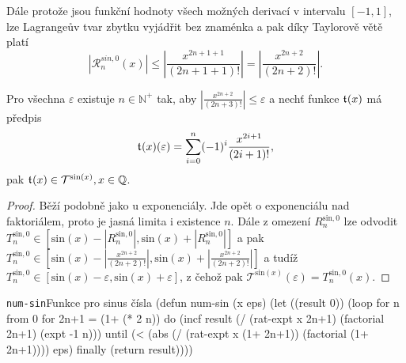 Dále protože jsou funkční hodnoty všech možných derivací v intervalu $[-1,1]$, lze Lagrangeův tvar zbytku vyjádřit bez znaménka a pak díky Taylorově větě platí
\begin{equation}
\left|\mathcal{R}^{sin, 0}_n(x)\right|\leq\left|\frac{x^{2n+1+1}}{(2n+1+1)!}\right|=\left|\frac{x^{2n+2}}{(2n+2)!}\right|.
\end{equation}

\begin{consequence}
Pro všechna $\varepsilon$ existuje $n\in\mathbb{N}^+$ tak, aby $\left|\frac{x^{2n+2}}{(2n+3)!}\right| \leq \varepsilon$ a nechť funkce $\mathfrak{t}^{}(x)$ má předpis
\begin{equation}
\mathfrak{t}^{}(x)(\varepsilon)=\sum_{i=0}^n (-1)^i \frac{x^{2i+1}}{(2i+1)!},
\end{equation}
pak $\mathfrak{t}^{}(x)\in\mathcal{T}^{\mathrm{sin}(x)},x\in\mathbb{Q}$.
\begin{proof}
Běží podobně jako u exponenciály. Jde opět o exponenciálu nad faktoriálem, proto je jasná limita i existence $n$. Dále z omezení $R^{\mathrm{sin}, 0}_n$ lze odvodit $T^{\mathrm{sin}, 0}_n\in[\mathrm{sin}(x)-|R^{\mathrm{sin}, 0}_n|,\mathrm{sin}(x)+|R^{\mathrm{sin}, 0}_n|]$ a pak $T^{\mathrm{sin}, 0}_n\in[\mathrm{sin}(x)-|\frac{x^{2n+2}}{(2n+2)!}|,\mathrm{sin}(x)+|\frac{x^{2n+2}}{(2n+2)!}|]$ a tudíž $T^{\mathrm{sin}, 0}_n\in[\mathrm{sin}(x)-\varepsilon,\mathrm{sin}(x)+\varepsilon]$, z čehož pak $\mathcal{T}^{\mathrm{sin}(x)}(\varepsilon)=T^{\mathrm{sin},0}_n(x)$.
\end{proof}
\end{consequence}

\begin{lispcode}{\texttt{num-sin}}{Funkce pro sinus čísla}
(\textcolor{funkcionalni}{defun} \textcolor{pojmenovan}{num-sin} (x eps)
  (\textcolor{vedlejsi}{let} ((result 0))
    (\textcolor{funkcionalni}{loop} \textcolor{obarvi}{for} n \textcolor{obarvi}{from} 0
          \textcolor{obarvi}{for} 2n+1 = (\textcolor{matematicke}{1+} (\textcolor{matematicke}{*} 2 n))
          \textcolor{obarvi}{do} (\textcolor{vedlejsi}{incf} result
                   (\textcolor{matematicke}{/} (\textcolor{moje}{rat-expt} x 2n+1)
                      (\textcolor{moje}{factorial} 2n+1) (\textcolor{matematicke}{expt} -1 n)))
          \textcolor{obarvi}{until} (\textcolor{matematicke}{<} (\textcolor{matematicke}{abs} (\textcolor{matematicke}{/} (\textcolor{moje}{rat-expt} x (\textcolor{matematicke}{1+} 2n+1))
                           (\textcolor{moje}{factorial} (\textcolor{matematicke}{1+} 2n+1))))
                   eps)
          \textcolor{obarvi}{finally} (\textcolor{funkcionalni}{return} result))))
\end{lispcode}

